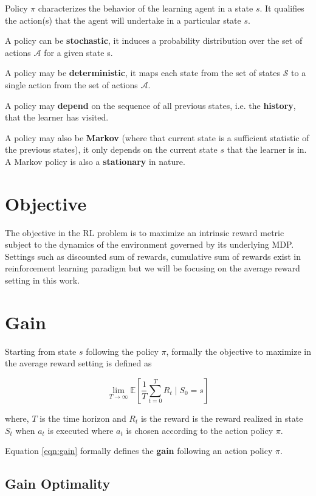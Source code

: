 Policy $\pi$ characterizes the behavior of the learning agent in a state $s$. 
It qualifies the action(s) that the agent will undertake in a particular state $s$.

A policy can be \textbf{stochastic}, it induces a probability distribution over the set of actions $\mathcal{A}$ for a given state s.

A policy may be \textbf{deterministic}, it maps each state from the set of states $\mathcal{S}$ to a single action from the set of actions $\mathcal{A}$.

A policy may \textbf{depend} on the sequence of all previous states, i.e. the \textbf{history}, that the learner has visited. 

A policy may also be \textbf{Markov} (where that current state is a sufficient statistic of the previous states), it only depends on the current state $s$ that the learner is in. 
A Markov policy is also a \textbf{stationary} in nature.

\section{Objective}

The objective in the RL problem is to maximize an intrinsic reward metric subject to the dynamics of the environment governed by its underlying MDP.
Settings such as discounted sum of rewards, cumulative sum of rewards exist in reinforcement learning paradigm but we will be focusing on the average reward setting in this work.


\section{Gain}
Starting from state $s$ following the policy $\pi$, formally the objective to maximize in the average reward setting is defined as

\begin{equation}
    \label{eqn:gain}
    \lim_{T \to \infty} \mathbb{E}\left[\frac{1}{T} \sum_{t=0}^{T} R_t \mid S_0 = s\right]
\end{equation}

where, $T$ is the time horizon and $R_t$ is the reward is the reward realized in state $S_t$ when $a_t$ is executed where $a_t$ is chosen according to the action policy $\pi$.

Equation \ref{eqn:gain} formally defines the \textbf{gain} following an action policy $\pi$.

\subsection*{Gain Optimality}

